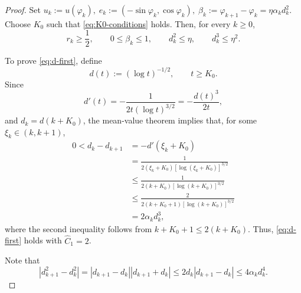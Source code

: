 \documentclass[10pt,a4paper]{amsart}
\begin{document}
\begin{proof}
Set
$
    u_k:=u(\varphi_k),
    \;
    e_k:=(-\sin\varphi_k,\cos\varphi_k),
    \;
    \beta_k:=\varphi_{k+1}-\varphi_k
             =\eta\alpha_kd_k^2.
$
Choose \(K_0\) such that
\eqref{eq:K0-conditions} holds. Then, for every \(k\geq0\),
\[
r_k\geq\frac12,
\qquad
0\leq\beta_k\leq1,
\qquad
d_k^2\leq\eta,
\qquad
d_k^3\leq\eta^2.
\label{eq:app-K-conditions}
\]


\noindent To prove \eqref{eq:d-first}, define
\[
d(t):=(\log t)^{-1/2},\qquad t\geq K_0.
\]
Since
\[
d'(t)
=-\frac{1}{2t(\log t)^{3/2}}
=-\frac{d(t)^3}{2t},
\]
and \(d_k=d(k+K_0)\), the mean-value theorem implies that, for some
\(\xi_k\in(k,k+1)\),
\begin{align*}
0<d_k-d_{k+1}
&=-d'(\xi_k+K_0)\\
&=\frac{1}{2(\xi_k+K_0)
[\log(\xi_k+K_0)]^{3/2}}\\
&\leq
\frac{1}{2(k+K_0)[\log(k+K_0)]^{3/2}}\\
&\leq
\frac{2}{2(k+K_0+1)[\log(k+K_0)]^{3/2}}\\
&=2\alpha_k d_k^3,
\end{align*}
where the second inequality follows from \(k+K_0+1\leq 2(k+K_0)\).
Thus, \eqref{eq:d-first} holds with
\(\widehat C_1=2\).


Note that
\begin{equation}
    \left|d_{k+1}^2-d_k^2\right|=\left|d_{k+1}-d_k\right|\left|d_{k+1}+d_k\right|\le 2d_k\left|d_{k+1}-d_k\right|
    \leq 4\alpha_kd_k^4.
    \label{eq:app-d-square}
\end{equation}


\end{proof}
\end{document}
